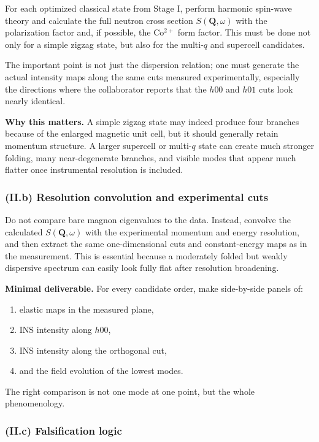 \documentclass[11pt]{article}
\begin{document}
For each optimized classical state from Stage I, perform harmonic spin-wave theory and calculate the full neutron cross section $S(\mathbf{Q},\omega)$ with the polarization factor and, if possible, the Co$^{2+}$ form factor. This must be done not only for a simple zigzag state, but also for the multi-$q$ and supercell candidates.

The important point is not just the dispersion relation; one must generate the actual intensity maps along the same cuts measured experimentally, especially the directions where the collaborator reports that the $h00$ and $h01$ cuts look nearly identical.

\textbf{Why this matters.} A simple zigzag state may indeed produce four branches because of the enlarged magnetic unit cell, but it should generally retain momentum structure. A larger supercell or multi-$q$ state can create much stronger folding, many near-degenerate branches, and visible modes that appear much flatter once instrumental resolution is included.

\subsubsection*{(II.b) Resolution convolution and experimental cuts}

Do not compare bare magnon eigenvalues to the data. Instead, convolve the calculated $S(\mathbf{Q},\omega)$ with the experimental momentum and energy resolution, and then extract the same one-dimensional cuts and constant-energy maps as in the measurement. This is essential because a moderately folded but weakly dispersive spectrum can easily look fully flat after resolution broadening.

\textbf{Minimal deliverable.} For every candidate order, make side-by-side panels of:
\begin{enumerate}[leftmargin=2em,itemsep=0.35em]
    \item elastic maps in the measured plane,
    \item INS intensity along $h00$,
    \item INS intensity along the orthogonal cut,
    \item and the field evolution of the lowest modes.
\end{enumerate}
The right comparison is not one mode at one point, but the whole phenomenology.

\subsubsection*{(II.c) Falsification logic}
\end{document}
